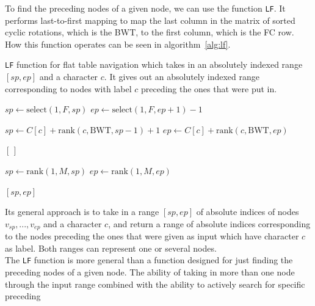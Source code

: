 \documentclass[a4paper,12pt,twoside,BCOR=10mm]{scrbook}
\begin{document}
To find the preceding nodes of a given node, 
we can use the function \texttt{LF}. It performs last-to-first mapping to 
map the last column in the matrix of sorted cyclic rotations, which is the BWT, 
to the first column, which is the FC row. 
How this function operates can be seen in algorithm~\ref{alg:lf}. 
\begin{algorithm}
\caption[\texttt{LF} function for flat table navigation]{\texttt{LF} function for flat table navigation which takes in an absolutely indexed range $ [ sp, ep ] $ and a character $ c $. It gives out an absolutely indexed range corresponding to nodes with label $ c $ preceding the ones that were put in.}
\label{alg:lf}
\begin{algorithmic}[1]

\State $ sp \gets \textrm{select}(1, F, sp) $
\State $ ep \gets \textrm{select}(1, F, ep + 1) - 1 $

\State \phantom{nl}

\State $ sp \gets C [ c ] + \textrm{rank}(c, \textrm{BWT}, sp - 1) + 1 $
\State $ ep \gets C [ c ] + \textrm{rank}(c, \textrm{BWT}, ep) $

\State \phantom{nl}

	\State \Return $ [ \, ] $
\EndIf

\State \phantom{nl}

\State $ sp \gets \textrm{rank}(1, M, sp) $
\State $ ep \gets \textrm{rank}(1, M, ep) $

\State \phantom{nl}

\State \Return $ [ sp, ep ] $

\end{algorithmic}
\end{algorithm}
Its general approach is to take in a range $ [ sp, ep ] $ of absolute indices of 
nodes $ v_{sp}, ..., v_{ep} $ and a character $ c $, 
and return a range of absolute indices corresponding to the nodes 
preceding the ones that were given as input which have character $ c $ as label. 
Both ranges can represent one or several nodes. \\
The \texttt{LF} function is more general than a function designed for just finding the 
preceding nodes of a given node. The ability of taking in more than one node through 
the input range combined with the ability to actively search for specific preceding 
\end{document}
